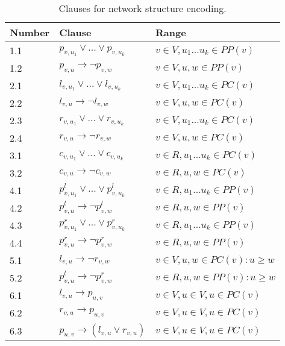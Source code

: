 \documentclass[runningheads, envcountsame, a4paper]{llncs}
\begin{document}
\begin{table}[t]
\centering
\caption{Clauses for network structure encoding.}
\begin{tabular}{l | l | l}
  Number & Clause & Range \\
  
  \hline
  1.1 &
  $p_{v,u_1} \vee ... \vee p_{v,u_k}$ &
  $v \in V, u_1 ... u_k \in PP(v)$
  \\
  1.2 &
  $p_{v,u} \rightarrow \neg p_{v,w}$ &
  $v \in V, u, w \in PP(v)$
  \\
  
  \hline
  2.1 &
  $l_{v,u_1} \vee ... \vee l_{v,u_k}$ &
  $v \in V, u_1 ... u_k \in PC(v)$
  \\
  2.2 &
  $l_{v,u} \rightarrow \neg l_{v,w}$ &
  $v \in V, u, w \in PC(v)$
  \\
  2.3 &
  $r_{v,u_1} \vee ... \vee r_{v,u_k}$ &
  $v \in V, u_1 ... u_k \in PC(v)$
  \\
  2.4 &
  $r_{v,u} \rightarrow \neg r_{v,w}$ &
  $v \in V, u, w \in PC(v)$
  \\
  
  \hline
  3.1 &
  $c_{v,u_1} \vee ... \vee c_{v,u_k}$ &
  $v \in R, u_1 ... u_k \in PC(v)$
  \\
  3.2 &
  $c_{v,u} \rightarrow \neg c_{v,w}$ &
  $v \in R, u, w \in PC(v)$
  \\
  
  \hline
  4.1 &
  $p^l_{v,u_1} \vee ... \vee p^l_{v,u_k}$ &
  $v \in R, u_1 ... u_k \in PP(v)$
  \\
  4.2 &
  $p^l_{v,u} \rightarrow \neg p^l_{v,w}$ &
  $v \in R, u, w \in PP(v)$
  \\
  4.3 &
  $p^r_{v,u_1} \vee ... \vee p^r_{v,u_k}$ &
  $v \in R, u_1 ... u_k \in PP(v)$
  \\
  4.4 &
  $p^r_{v,u} \rightarrow \neg p^r_{v,w}$ &
  $v \in R, u, w \in PP(v)$
  \\

  \hline
  5.1 &
  $l_{v,u} \rightarrow \neg r_{v,w}$ &
  $v \in V, u, w \in PC(v): u \geq w$
  \\
  5.2 &
  $p^l_{v,u} \rightarrow \neg p^r_{v,w}$ &
  $v \in R, u, w \in PP(v) : u \geq w$
  \\
  
  \hline
  6.1 &
  $l_{v,u} \rightarrow p_{u,v}$ &
  $v \in V, u \in V, u \in PC(v)$
  \\
  6.2 &
  $r_{v,u} \rightarrow p_{u,v}$ &
  $v \in V, u \in V, u \in PC(v)$
  \\
  6.3 &
  $p_{u,v} \rightarrow (l_{v,u} \vee r_{v,u})$ &
  $v \in V, u \in V, u \in PC(v)$
  \\
  

\end{tabular}
\end{table}
\end{document}
